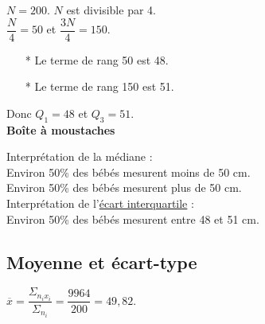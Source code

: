 $ N = 200 $. $N$ est divisible par 4. \\

$\dfrac{N}{4} = 50 $ et $\dfrac{3N}{4} = 150 $. \\

\begin{itemize}
\item[*] Le terme de rang 50 est 48.
\item[*] Le terme de rang 150 est 51.
\end{itemize}

\vspace*{.3cm}

Donc $Q_1 = 48$ et $Q_3 = 51$. \\

\textbf{Boîte à moustaches}

\bigskip 



Interprétation de la médiane : \\

Environ 50\% des bébés mesurent moins de 50 cm. \\
Environ 50\% des bébés mesurent plus de 50 cm. \\

Interprétation de l'\underline{écart interquartile} : \\

Environ 50\% des bébés mesurent entre 48 et 51 cm. 

\subsection{Moyenne et écart-type}

$\overline{x} = \dfrac{\Sigma_{n_ix_i}}{\Sigma_{n_i}} = \dfrac{9964}{200} = 49,82$. \\

